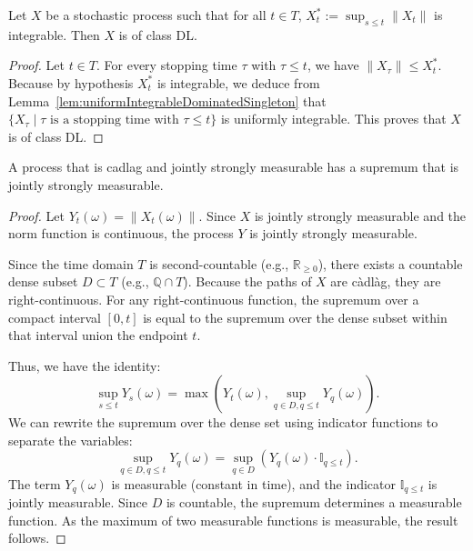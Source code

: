 \begin{lemma}\label{lem:Integrable.classDL}
  \leanok
Let $X$ be a stochastic process such that for all $t \in T$, $X^*_t := \sup_{s \le t} \|X_t\|$ is integrable. Then $X$ is of class DL.
\end{lemma}

\begin{proof}
Let $t \in T$. For every stopping time $\tau$ with $\tau \le t$, we have $\|X_\tau\| \le X^*_t$. Because by hypothesis $X^*_t$ is integrable, we deduce from Lemma~\ref{lem:uniformIntegrableDominatedSingleton} that $\{X_\tau \mid \tau \text{ is a stopping time with } \tau \le t\}$ is uniformly integrable. This proves that $X$ is of class DL.
\end{proof}


\begin{lemma}\label{lem:HasStronglyMeasurableSup_of_isCadlag}
  \leanok
  A process that is cadlag and jointly strongly measurable has a supremum that is jointly strongly measurable.
\end{lemma}
\begin{proof}
 Let $Y_t(\omega) = \|X_t(\omega)\|$. Since $X$ is jointly strongly measurable and the norm function is continuous, the process $Y$ is jointly strongly measurable.

  Since the time domain $T$ is second-countable (e.g., $\mathbb{R}_{\ge 0}$), there exists a countable dense subset $D \subset T$ (e.g., $\mathbb{Q} \cap T$).
  Because the paths of $X$ are càdlàg, they are right-continuous. For any right-continuous function, the supremum over a compact interval $[0, t]$ is equal to the supremum over the dense subset within that interval union the endpoint $t$.

  Thus, we have the identity:
  \[ \sup_{s \le t} Y_s(\omega) = \max \left( Y_t(\omega), \sup_{q \in D, q \le t} Y_q(\omega) \right). \]
  We can rewrite the supremum over the dense set using indicator functions to separate the variables:
  \[ \sup_{q \in D, q \le t} Y_q(\omega) = \sup_{q \in D} \left( Y_q(\omega) \cdot \mathbb{I}_{q \le t} \right). \]
  The term $Y_q(\omega)$ is measurable (constant in time), and the indicator $\mathbb{I}_{q \le t}$ is jointly measurable. Since $D$ is countable, the supremum determines a measurable function. As the maximum of two measurable functions is measurable, the result follows.
\end{proof}

